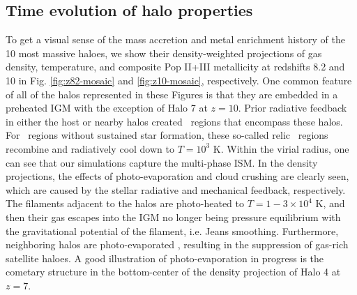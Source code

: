 \documentclass[useAMS,usenatbib]{mn2e}
\begin{document}
\subsection{Time evolution of halo properties}

\begin{figure*}
  \vspace{150pt}
  \caption{\label{fig:z82-mosaic} Density-weighted projections of
    density (left), temperature (center), and metallicity (right) of
    the 10 most massive haloes at $z=8.2$ in our primary model.  The
    field of view is 5 proper kpc, and the circles have a radius of
    $r_{200}$.  The composite metallicity images are constructed in
    the same fashion as Fig. \ref{fig:evo-mosaic}.}
\end{figure*}

\begin{figure*}
  \caption{\label{fig:z10-mosaic} Same as Fig. \ref{fig:z82-mosaic}
    but at $z=10$, showing the progenitors of the 10 most massive
    haloes at $z=8.2$.}
\end{figure*}


To get a visual sense of the mass accretion and metal enrichment
history of the 10 most massive haloes, we show their density-weighted
projections of gas density, temperature, and composite Pop II+III
metallicity at redshifts 8.2 and 10 in Fig. \ref{fig:z82-mosaic} and
\ref{fig:z10-mosaic}, respectively.  One common feature of all of the
halos represented in these Figures is that they are embedded in a
preheated IGM with the exception of Halo 7 at $z=10$.  Prior radiative
feedback in either the host or nearby halos created \hii~regions that
encompass these halos.  For \hii~regions without sustained star
formation, these so-called relic \hii~regions recombine and
radiatively cool down to $T = 10^3$ K.  Within the virial radius, one
can see that our simulations capture the multi-phase ISM.  In the
density projections, the effects of photo-evaporation and cloud
crushing are clearly seen, which are caused by the stellar radiative
and mechanical feedback, respectively.  The filaments adjacent to the
halos are photo-heated to $T = 1-3 \times 10^4$ K, and then their gas
escapes into the IGM no longer being pressure equilibrium with the
gravitational potential of the filament, i.e. Jeans smoothing.
Furthermore, neighboring halos are photo-evaporated \citep[see][for
the level of halo photo-evaporation]{Wise08_Reion}, resulting in the
suppression of gas-rich satellite haloes.  A good illustration of
photo-evaporation in progress is the cometary structure in the
bottom-center of the density projection of Halo 4 at $z=7$.
\end{document}
